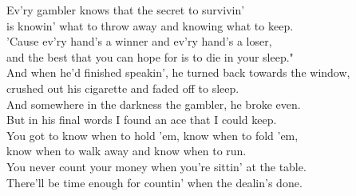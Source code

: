  Ev'ry gambler knows that the  secret to survivin'\\
is knowin' what to throw away and knowing what to  keep.\\
'Cause  ev'ry hand's a winner and  ev'ry hand's a  loser,\\
and the  best that you can  hope for is to  die in your  sleep."\\
And  when he'd finished speakin', he  turned back towards the  window,\\
crushed out his cigarette and faded off to  sleep.\\
And  somewhere in the darkness the  gambler, he broke  even.\\
But  in his final  words I found an  ace that I could  keep.\\
You got to  know when to hold 'em,  know when to  fold 'em,\\
 know when to  walk away and know when to  run.\\
You never  count  your  money when you're  sittin' at the  table.\\
There'll be  time enough for  countin'  when the dealin's  done.\\
